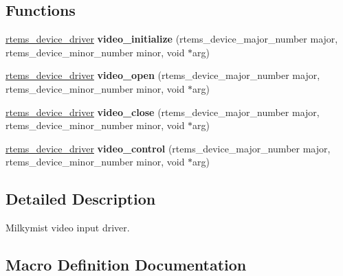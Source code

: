 \subsection*{Functions}
\begin{DoxyCompactItemize}
\item 
\mbox{\label{group__lm32__milkymist__video_ga3ade8174ff2e6f260f272a28759856ea}} 
\mbox{\hyperlink{group__ClassicStatus_ga545d41846817eaba6143d52ee4d9e9fe}{rtems\+\_\+device\+\_\+driver}} {\bfseries video\+\_\+initialize} (rtems\+\_\+device\+\_\+major\+\_\+number major, rtems\+\_\+device\+\_\+minor\+\_\+number minor, void $\ast$arg)
\item 
\mbox{\label{group__lm32__milkymist__video_gae6f2c6d7dc7a6a510118d2fd711f507f}} 
\mbox{\hyperlink{group__ClassicStatus_ga545d41846817eaba6143d52ee4d9e9fe}{rtems\+\_\+device\+\_\+driver}} {\bfseries video\+\_\+open} (rtems\+\_\+device\+\_\+major\+\_\+number major, rtems\+\_\+device\+\_\+minor\+\_\+number minor, void $\ast$arg)
\item 
\mbox{\label{group__lm32__milkymist__video_gaee2329ab51b251d87fffca35b0b6118a}} 
\mbox{\hyperlink{group__ClassicStatus_ga545d41846817eaba6143d52ee4d9e9fe}{rtems\+\_\+device\+\_\+driver}} {\bfseries video\+\_\+close} (rtems\+\_\+device\+\_\+major\+\_\+number major, rtems\+\_\+device\+\_\+minor\+\_\+number minor, void $\ast$arg)
\item 
\mbox{\label{group__lm32__milkymist__video_ga00b869b0bbd37d668e833d94a2448e40}} 
\mbox{\hyperlink{group__ClassicStatus_ga545d41846817eaba6143d52ee4d9e9fe}{rtems\+\_\+device\+\_\+driver}} {\bfseries video\+\_\+control} (rtems\+\_\+device\+\_\+major\+\_\+number major, rtems\+\_\+device\+\_\+minor\+\_\+number minor, void $\ast$arg)
\end{DoxyCompactItemize}


\subsection{Detailed Description}
Milkymist video input driver. 



\subsection{Macro Definition Documentation}
\mbox{\label{group__lm32__milkymist__video_ga88863f791d24094b23c6c033221b7abb}} 
